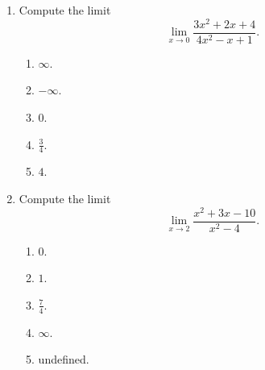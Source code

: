 \documentclass{article}
\begin{document}
\begin{enumerate}
  
  \item Compute the limit \[\lim_{x\to0} \frac{3x^2+2x+4}{4x^2-x+1}.\]
  \begin{enumerate}
    \item $\infty$.
    \item $-\infty$.
    \item $0$.
    \item $\frac{3}{4}$.
    \item $4$.  %
  \end{enumerate}


\item Compute the limit \[\lim_{x\to2} \frac{x^2+3x-10}{x^2-4}.\]
  \begin{enumerate}
    \item $0$.
    \item $1$.
    \item $\frac{7}{4}$.  %
    \item $\infty$.
    \item undefined.
  \end{enumerate}
  
  
    
\end{enumerate}
\end{document}
